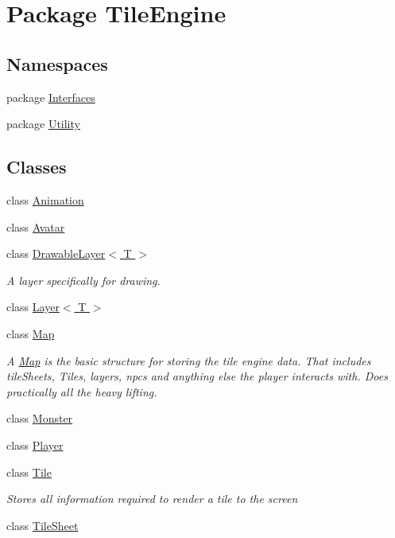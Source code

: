 \hypertarget{namespace_tile_engine}{\section{Package Tile\-Engine}
\label{d6/d3c/namespace_tile_engine}
}
\subsection*{Namespaces}
\begin{DoxyCompactItemize}
\item 
package \hyperlink{namespace_tile_engine_1_1_interfaces}{Interfaces}
\item 
package \hyperlink{namespace_tile_engine_1_1_utility}{Utility}
\end{DoxyCompactItemize}
\subsection*{Classes}
\begin{DoxyCompactItemize}
\item 
class \hyperlink{class_tile_engine_1_1_animation}{Animation}
\item 
class \hyperlink{class_tile_engine_1_1_avatar}{Avatar}
\item 
class \hyperlink{class_tile_engine_1_1_drawable_layer_3_01_t_01_4}{Drawable\-Layer$<$ T $>$}
\begin{DoxyCompactList}\small\item\em A layer specifically for drawing. \end{DoxyCompactList}\item 
class \hyperlink{class_tile_engine_1_1_layer_3_01_t_01_4}{Layer$<$ T $>$}
\item 
class \hyperlink{class_tile_engine_1_1_map}{Map}
\begin{DoxyCompactList}\small\item\em A \hyperlink{class_tile_engine_1_1_map}{Map} is the basic structure for storing the tile engine data. That includes tile\-Sheets, Tiles, layers, npcs and anything else the player interacts with. Does practically all the heavy lifting. \end{DoxyCompactList}\item 
class \hyperlink{class_tile_engine_1_1_monster}{Monster}
\item 
class \hyperlink{class_tile_engine_1_1_player}{Player}
\item 
class \hyperlink{class_tile_engine_1_1_tile}{Tile}
\begin{DoxyCompactList}\small\item\em Stores all information required to render a tile to the screen \end{DoxyCompactList}\item 
class \hyperlink{class_tile_engine_1_1_tile_sheet}{Tile\-Sheet}
\end{DoxyCompactItemize}
